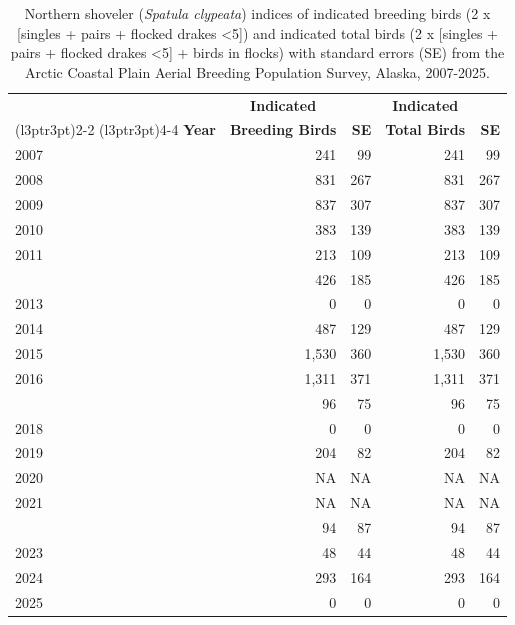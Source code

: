\documentclass[
]{article}
\begin{document}
\begin{longtable}[t]{lrrrr}

\caption{\label{tbl-NSHO}Northern shoveler (\emph{Spatula clypeata})
indices of indicated breeding birds (2 x {[}singles + pairs + flocked
drakes \textless5{]}) and indicated total birds (2 x {[}singles + pairs
+ flocked drakes \textless5{]} + birds in flocks) with standard errors
(SE) from the Arctic Coastal Plain Aerial Breeding Population Survey,
Alaska, 2007-2025.}

\tabularnewline

\\
\toprule
\multicolumn{1}{c}{\textbf{ }} & \multicolumn{1}{c}{\textbf{Indicated}} & \multicolumn{1}{c}{\textbf{ }} & \multicolumn{1}{c}{\textbf{Indicated}} & \multicolumn{1}{c}{\textbf{ }} \\
\cmidrule(l{3pt}r{3pt}){2-2} \cmidrule(l{3pt}r{3pt}){4-4}
\textbf{Year} & \textbf{Breeding Birds} & \textbf{SE} & \textbf{Total Birds} & \textbf{SE}\\
\midrule
2007 & 241 & 99 & 241 & 99\\
2008 & 831 & 267 & 831 & 267\\
2009 & 837 & 307 & 837 & 307\\
2010 & 383 & 139 & 383 & 139\\
2011 & 213 & 109 & 213 & 109\\
\addlinespace
2012 & 426 & 185 & 426 & 185\\
2013 & 0 & 0 & 0 & 0\\
2014 & 487 & 129 & 487 & 129\\
2015 & 1,530 & 360 & 1,530 & 360\\
2016 & 1,311 & 371 & 1,311 & 371\\
\addlinespace
2017 & 96 & 75 & 96 & 75\\
2018 & 0 & 0 & 0 & 0\\
2019 & 204 & 82 & 204 & 82\\
2020 & NA & NA & NA & NA\\
2021 & NA & NA & NA & NA\\
\addlinespace
2022 & 94 & 87 & 94 & 87\\
2023 & 48 & 44 & 48 & 44\\
2024 & 293 & 164 & 293 & 164\\
2025 & 0 & 0 & 0 & 0\\
\bottomrule

\end{longtable}

\endgroup{}
\end{document}

